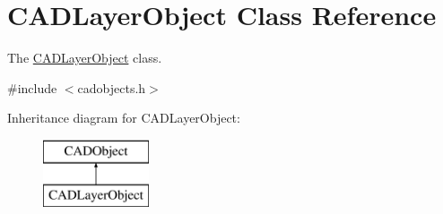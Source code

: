 \hypertarget{class_c_a_d_layer_object}{}\section{C\+A\+D\+Layer\+Object Class Reference}
\label{class_c_a_d_layer_object}


The \hyperlink{class_c_a_d_layer_object}{C\+A\+D\+Layer\+Object} class.  




{\ttfamily \#include $<$cadobjects.\+h$>$}

Inheritance diagram for C\+A\+D\+Layer\+Object\+:\begin{figure}[H]
\begin{center}
\leavevmode
\includegraphics[height=2.000000cm]{class_c_a_d_layer_object}
\end{center}
\end{figure}
